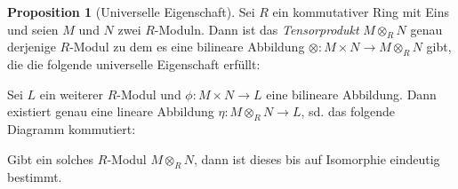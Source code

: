 \documentclass[11pt,titlepage]{article}
\theoremstyle{definition}
\newtheorem{proposition}[theorem]{Proposition}
\theoremstyle{remark}
\begin{document}
	
	\begin{proposition}[Universelle Eigenschaft] \label{prop:univeig}
		Sei $R$ ein kommutativer Ring mit Eins und seien $M$ und $N$ zwei $R$-Moduln. Dann ist das 
		\textsl{Tensorprodukt} $M\otimes_R N$ genau derjenige $R$-Modul zu dem es eine bilineare Abbildung 
		$\otimes: M\times N \to M\otimes_R N$ gibt, die die folgende universelle Eigenschaft erfüllt:
		\begin{center}
			Sei $L$ ein weiterer $R$-Modul und $\phi: M\times N \to L$ eine bilineare Abbildung. Dann 
			existiert genau eine lineare Abbildung $\eta: M\otimes_R N \to L$, sd. das folgende Diagramm 
			kommutiert:
			\begin{center}
			\end{center}
		\end{center}
		Gibt ein solches $R$-Modul $M\otimes_R N$, dann ist dieses bis auf Isomorphie eindeutig bestimmt.
	\end{proposition}
	
\end{document}
